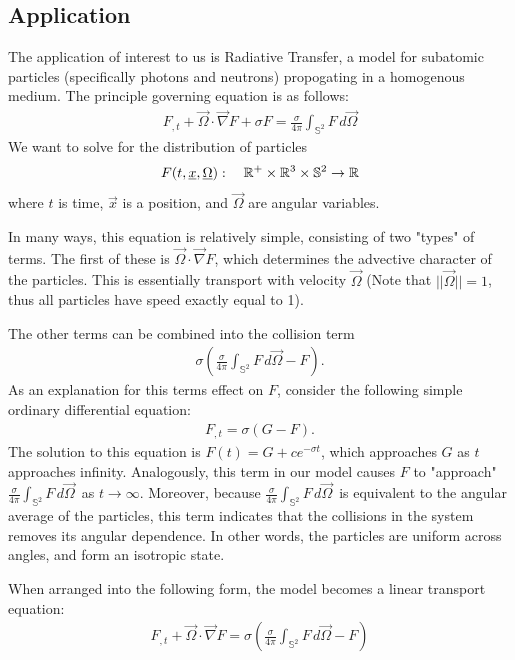 
\subsection{Application}

The application of interest to us is Radiative Transfer, a model for subatomic particles (specifically photons and neutrons) propogating in a homogenous medium.
The principle governing equation is as follows:
\begin{align*}
	F_{,t} + \vec{\Omega} \cdot \vec{\nabla}F + \sigma F = \frac{\sigma}{4\pi}\int_{\mathbb{S}^2}F\,d\vec\Omega
\end{align*}
We want to solve for the distribution of particles
\begin{align*}
	F( t, {\underline{x}}, {\underline{\Omega}}) : \quad \mathbb{R}^+ \times \mathbb{R}^3 \times \mathbb{S}^2 \to \mathbb{R}
\end{align*}
where $t$ is time, $\vec{x}$ is a position, and $\vec{\Omega}$ are angular variables.

In many ways, this equation is relatively simple, consisting of two "types" of terms.
The first of these is $ \vec{\Omega} \cdot \vec{\nabla}F $, which determines the advective character of the particles.
This is essentially transport with velocity $\vec{\Omega}$ (Note that $||\vec{\Omega}|| = 1$, thus all particles have speed exactly equal to 1).

The other terms can be combined into the collision term 
\begin{align*}
	\sigma\left(\frac{\sigma}{4\pi}\int_{\mathbb{S}^2}F\,d\vec\Omega - F\right).
\end{align*}
As an explanation for this terms effect on $F$, consider the following simple ordinary differential equation:
\begin{align*}
	F_{,t} = \sigma( G - F ).
\end{align*}
The solution to this equation is $F(t) = G + ce^{-\sigma t}$, which approaches $G$ as $t$ approaches infinity.
Analogously, this term in our model causes $F$ to "approach" $\frac{\sigma}{4\pi}\int_{\mathbb{S}^2}F\,d\vec\Omega\,$ as $t\to \infty$.
Moreover, because $\frac{\sigma}{4\pi}\int_{\mathbb{S}^2}F\,d\vec\Omega\,$ is equivalent to the angular average of the particles, this term indicates that the collisions in the system removes its angular dependence.
In other words, the particles are uniform across angles, and form an isotropic state.

When arranged into the following form, the model becomes a linear transport equation:
\begin{align*}
	F_{,t} + \vec{\Omega} \cdot \vec{\nabla}F = \sigma \left(\frac{\sigma}{4\pi}\int_{\mathbb{S}^2}F\,d\vec\Omega - F\right)
\end{align*}

